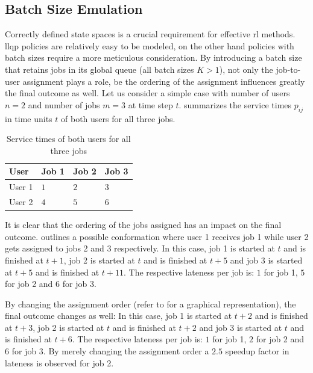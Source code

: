 \subsection{Batch Size Emulation}
\label{subsec:batch_size_emulation}

Correctly defined state spaces is a crucial requirement for effective \gls{rl} methods. \gls{llqp} policies are relatively easy to be modeled, on the other hand policies with batch sizes require a more meticulous consideration. By introducing a batch size that retains jobs in its global queue (\ie all batch sizes $K>1$), not only the job-to-user assignment plays a role, be the ordering of the assignment influences greatly the final outcome as well. Let us consider a simple case with number of users $n=2$ and number of jobs $m=3$ at time step $t$.  summarizes the service times $p_{ij}$ in time units $t$ of both users for all three jobs.

\begin{table}[!ht]
	\centering
		\begin{tabular}{@{}llll@{}}
		\toprule
		User   & Job 1 & Job 2 & Job 3 \\ \midrule
		User 1 & $1$     & $2$     & $3$     \\
		User 2 & $4$     & $5$     & $6$     \\ \bottomrule
		\end{tabular}
	\caption{Service times of both users for all three jobs}
	\label{tab:users_service_times_example}
\end{table}

It is clear that the ordering of the jobs assigned has an impact on the final outcome.  outlines a possible conformation where user 1 receives job 1 while user 2 gets assigned to jobs 2 and 3 respectively. In this case, job 1 is started at $t$ and is finished at $t+1$, job 2 is started at $t$ and is finished at $t+5$ and job 3 is started at $t+5$ and is finished at $t+11$. The respective lateness per job is: $1$ for job 1, $5$ for job 2 and $6$ for job $3$.

By changing the assignment order (refer to  for a graphical representation), the final outcome changes as well: In this case, job 1 is started at $t+2$ and is finished at $t+3$, job 2 is started at $t$ and is finished at $t+2$ and job 3 is started at $t$ and is finished at $t+6$. The respective lateness per job is: $1$ for job 1, $2$ for job 2 and $6$ for job $3$. By merely changing the assignment order a $2.5$ speedup factor in lateness is observed for job 2.

